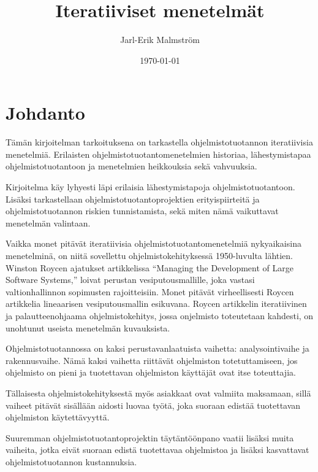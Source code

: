 \documentclass[finnish]{tktltiki2}
\title{Iteratiiviset menetelmät}
\author{Jarl-Erik Malmström}
\date{\today}
\theoremstyle{definition}
\theoremstyle{remark}
\begin{document}

\maketitle        %
\makeabstract     %

\tableofcontents  %
\newpage          %



\section{Johdanto}

Tämän kirjoitelman tarkoituksena on tarkastella ohjelmistotuotannon iteratiivisia menetelmiä. Erilaisten ohjelmistotuotantomenetelmien historiaa, lähestymistapaa ohjelmistotuotantoon ja menetelmien heikkouksia sekä vahvuuksia. 

Kirjoitelma käy lyhyesti läpi erilaisia lähestymistapoja ohjelmistotuotantoon. Lisäksi tarkastellaan ohjelmistotuotantoprojektien erityispiirteitä ja ohjelmistotuotannon riskien tunnistamista, sekä miten nämä vaikuttavat menetelmän valintaan. 

Vaikka monet pitävät iteratiivisia ohjelmistotuotantomenetelmiä nykyaikaisina menetelminä, on niitä sovellettu ohjelmistokehityksessä 1950-luvulta lähtien. Winston Roycen ajatukset artikkelissa “Managing the Development of Large Software Systems,” loivat perustan vesiputousmallille, joka vastasi valtionhallinnon sopimusten rajoitteisiin. Monet pitävät virheellisesti Roycen artikkelia lineaarisen vesiputousmallin esikuvana. Roycen artikkelin iteratiivinen ja palautteenohjaama ohjelmistokehitys, jossa onjelmisto toteutetaan kahdesti, on unohtunut useista menetelmän kuvauksista.\cite{LAB03}

Ohjelmistotuotannossa on kaksi perustavanlaatuista vaihetta: analysointivaihe ja rakennusvaihe. Nämä kaksi vaihetta riittävät ohjelmiston totetuttamiseen, jos ohjelmisto on pieni ja tuotettavan ohjelmiston käyttäjät ovat itse toteuttajia.\cite{ROY70} 

Tällaisesta ohjelmistokehityksestä myös asiakkaat ovat valmiita maksamaan, sillä vaiheet pitävät sisällään aidosti luovaa työtä, joka suoraan edistää tuotettavan ohjelmiston käytettävyyttä.\cite{ROY70}

Suuremman ohjelmistotuotantoprojektin täytäntöönpano vaatii lisäksi muita vaiheita, jotka eivät suoraan edistä tuotettavaa ohjelmistoa ja lisäksi kasvattavat ohjelmistotuotannon kustannuksia.\cite{ROY70}
\end{document}
